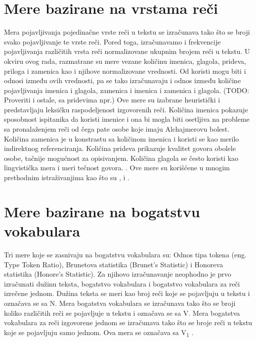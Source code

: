 \documentclass[12pt,oneside]{memoir}
\begin{document}
\section{Mere bazirane na vrstama reči}

Mera pojavljivanja pojedinačne vrste reči u tekstu se izračunava tako što se broji svako pojavljivanje te vrste reči.  Pored toga,  izračunavamo i frekvencije pojavljivanja različitih vrsta reči normalizovane ukupnim brojem reči u tekstu.  U okviru ovog rada, razmatrane su mere vezane količinu imenica,  glagola,  prideva, priloga i zamenica kao i njihove normalizovane vrednosti.  Od koristi mogu biti i odnosi između ovih vrednosti, pa se tako izračunavaju i odnos između količine pojavljivanja imenica i glagola,  zamenica i imenica i zamenica i glagola.  (TODO: Proveriti i ostale, sa pridevima npr.) Ove mere su izabrane heuristički i predstavljaju leksičku raspodeljenost izgovorenih reči.  
Količina imenica pokazuje sposobnost ispitanika da koristi imenice i ona bi mogla biti osetljiva na probleme sa pronalaženjem reči od čega pate osobe koje imaju Alchajmerovu bolest. Količina zamenica je u konstrastu sa količinom imenica i koristi se kao merilo indirektnog referenciranja.  Količina prideva prikazuje kvalitet govora obolele osobe, tačnije mogućnost za opisivanjem. Količina glagola se često koristi kao lingvistička mera i meri tečnost govora. \cite{Evaloftechfolexicalperformance}.  Ove mere su korišćene u mnogim prethodnim istraživanjima kao što su \cite{automaticdetandrat}, \cite{Evaloftechfolexicalperformance} i \cite{linguisticfeatures}. 

\section{Mere bazirane na bogatstvu vokabulara}
 
Tri mere koje se zasnivaju na bogatstvu vokabulara su: Odnos tipa tokena (eng. Type Token Ratio),  Brunetova statistika (Brunet's Statistic) i Honoreva statistika (Honore's Statistic).  Za njihovo izračunavanje neophodno je prvo izračunati dužinu teksta, bogatstvo vokabulara i bogatstvo vokabulara za reči izrečene jednom.  Dužina teksta se meri kao broj reči koje se pojavljuju u tekstu i označava se sa N.  Mera bogatstva vokabulara se izračunava tako što se broji koliko različitih reči se pojavljuje u tekstu i označava se sa V. Mera bogatstva vokabulara za reči izgovorene jednom se izračunava tako što se broje reči u tekstu koje se pojavljuju samo jednom.  Ova mera se označava sa V\textsubscript{1} .  
\end{document}
